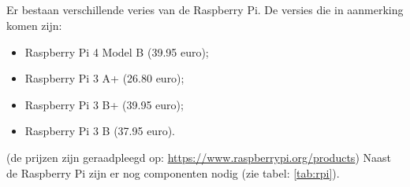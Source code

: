 \subsection{}
Er bestaan verschillende veries van de Raspberry Pi. De versies die in aanmerking komen zijn:
\begin{itemize}
    \item Raspberry Pi 4 Model B (39.95 euro);
    \item Raspberry Pi 3 A+ (26.80 euro);
    \item Raspberry Pi 3 B+ (39.95 euro);
    \item Raspberry Pi 3 B (37.95 euro).
\end{itemize}
(de prijzen zijn geraadpleegd op: \url{https://www.raspberrypi.org/products})
\newline
Naast de Raspberry Pi zijn er nog componenten nodig (zie tabel: \ref{tab:rpi}).
